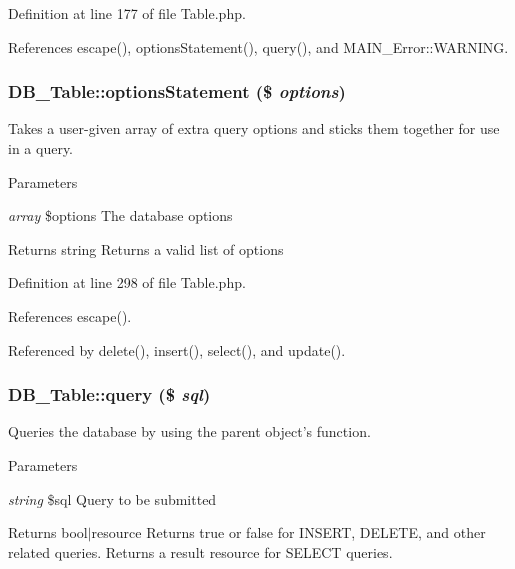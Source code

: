 Definition at line 177 of file Table.php.

References escape(), optionsStatement(), query(), and MAIN\_\-Error::WARNING.\hypertarget{classDB__Table_a56bde02ad43e915898c7709e4d2ec75e}{
\subsubsection[{optionsStatement}]{\setlength{\rightskip}{0pt plus 5cm}DB\_\-Table::optionsStatement (\$ {\em options})}}
\label{d6/d90/classDB__Table_a56bde02ad43e915898c7709e4d2ec75e}
Takes a user-\/given array of extra query options and sticks them together for use in a query.


\begin{DoxyParams}{Parameters}
\item[{\em array}]\$options The database options\end{DoxyParams}
\begin{DoxyReturn}{Returns}
string Returns a valid list of options 
\end{DoxyReturn}


Definition at line 298 of file Table.php.

References escape().

Referenced by delete(), insert(), select(), and update().\hypertarget{classDB__Table_a88064818e52f2002d18849600e077239}{
\subsubsection[{query}]{\setlength{\rightskip}{0pt plus 5cm}DB\_\-Table::query (\$ {\em sql})}}
\label{d6/d90/classDB__Table_a88064818e52f2002d18849600e077239}
Queries the database by using the parent object's function.


\begin{DoxyParams}{Parameters}
\item[{\em string}]\$sql Query to be submitted\end{DoxyParams}
\begin{DoxyReturn}{Returns}
bool$|$resource Returns true or false for INSERT, DELETE, and other related queries. Returns a result resource for SELECT queries. 
\end{DoxyReturn}


